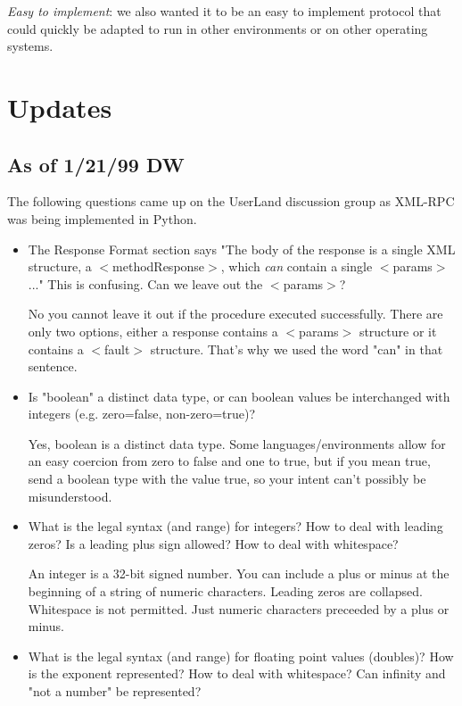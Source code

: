 \documentclass[10pt]{article}
\begin{document}
\emph{Easy to implement}: we also wanted it to be an easy to implement protocol that could quickly be adapted to run in other environments or on other operating systems.


%
%

\section{Updates}

\subsection{As of 1/21/99 DW}

The following questions came up on the UserLand discussion group as XML-RPC was being implemented in Python.
\begin{itemize}
\item The Response Format section says "The body of the response is a single XML structure, a $<$methodResponse$>$, which \emph{ can}
contain a single $<$params$>$..." This is confusing. Can we leave out the $<$params$>$? 

No you cannot leave it out if the procedure executed successfully. There are only two options, either a response contains a $<$params$>$ structure or it contains a $<$fault$>$ structure. That's why we used the word "can" in that sentence.

\item Is "boolean" a distinct data type, or can boolean values be interchanged with integers (e.g. zero=false, non-zero=true)? 

Yes, boolean is a distinct data type. Some languages/environments allow for an easy coercion from zero to false and one to true, but if you mean true, send a boolean type with the value true, so your intent can't possibly be misunderstood.

\item What is the legal syntax (and range) for integers? How to deal with leading zeros? Is a leading plus sign allowed? How to deal with whitespace? 

An integer is a 32-bit signed number. You can include a plus or minus at the beginning of a string of numeric characters. Leading zeros are collapsed. Whitespace is not permitted. Just numeric characters preceeded by a plus or minus.

\item What is the legal syntax (and range) for floating point values (doubles)? How is the exponent represented? How to deal with whitespace? Can infinity and "not a number" be represented? 


\end{itemize}
\end{document}
